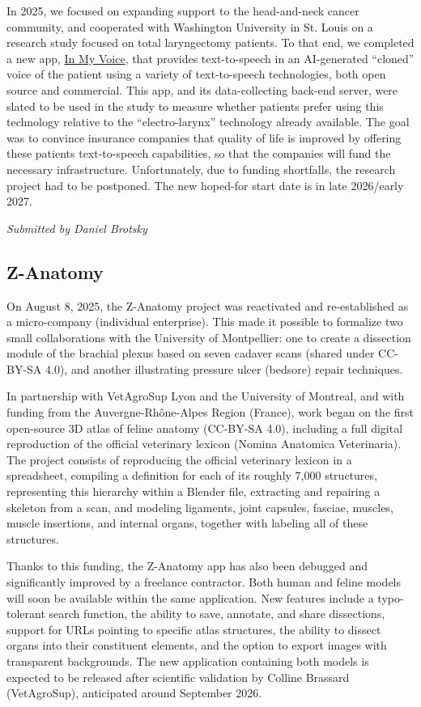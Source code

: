 \documentclass[a4paper]{report}
\begin{document}
In 2025, we focused on expanding support to the head-and-neck cancer community, and cooperated with Washington University in St. Louis on a research study focused on total laryngectomy patients. To that end, we completed a new app, \href{https://apps.apple.com/app/in-my-voice/id6742593911}{In My Voice}, that provides text-to-speech in an AI-generated ``cloned'' voice of the patient using a variety of text-to-speech technologies, both open source and commercial. This app, and its data-collecting back-end server, were slated to be used in the study to measure whether patients prefer using this technology relative to the ``electro-larynx'' technology already available. The goal was to convince insurance companies that quality of life is improved by offering these patients text-to-speech capabilities, so that the companies will fund the necessary infrastructure. Unfortunately, due to funding shortfalls, the research project had to be postponed. The new hoped-for start date is in late 2026/early 2027.

{\em Submitted by Daniel Brotsky}

\subsection{Z-Anatomy}

On August 8, 2025, the Z-Anatomy project was reactivated and re-established as a micro-company (individual enterprise). This made it possible to formalize two small collaborations with the University of Montpellier: one to create a dissection module of the brachial plexus based on seven cadaver scans (shared under CC-BY-SA 4.0), and another illustrating pressure ulcer (bedsore) repair techniques.

In partnership with VetAgroSup Lyon and the University of Montreal, and with funding from the Auvergne-Rhône-Alpes Region (France), work began on the first open-source 3D atlas of feline anatomy (CC-BY-SA 4.0), including a full digital reproduction of the official veterinary lexicon (Nomina Anatomica Veterinaria). The project consists of reproducing the official veterinary lexicon in a spreadsheet, compiling a definition for each of its roughly 7,000 structures, representing this hierarchy within a Blender file, extracting and repairing a skeleton from a scan, and modeling ligaments, joint capsules, fasciae, muscles, muscle insertions, and internal organs, together with labeling all of these structures.

Thanks to this funding, the Z-Anatomy app has also been debugged and significantly improved by a freelance contractor. Both human and feline models will soon be available within the same application. New features include a typo-tolerant search function, the ability to save, annotate, and share dissections, support for URLs pointing to specific atlas structures, the ability to dissect organs into their constituent elements, and the option to export images with transparent backgrounds. The new application containing both models is expected to be released after scientific validation by Colline Brassard (VetAgroSup), anticipated around September 2026.
\end{document}
